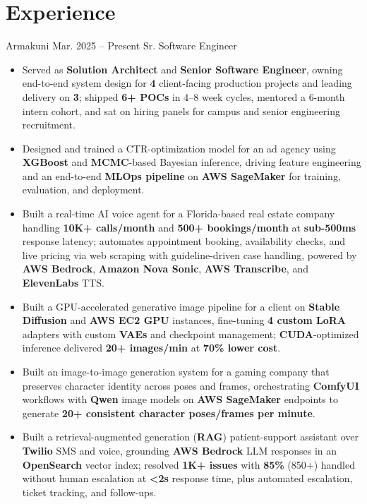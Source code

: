 \section{Experience}

\resumeSubheading
  {Armakuni}
  {Mar. 2025 – Present}
  {Sr. Software Engineer}
  {}
\begin{itemize}
  \item Served as \textbf{Solution Architect} and \textbf{Senior Software Engineer}, owning end-to-end system design for \textbf{4} client-facing production projects and leading delivery on \textbf{3}; shipped \textbf{6+ POCs} in 4–8 week cycles, mentored a 6-month intern cohort, and sat on hiring panels for campus and senior engineering recruitment.
  \item Designed and trained a CTR-optimization model for an ad agency using \textbf{XGBoost} and \textbf{MCMC}-based Bayesian inference, driving feature engineering and an end-to-end \textbf{MLOps pipeline} on \textbf{AWS SageMaker} for training, evaluation, and deployment.
  \item Built a real-time AI voice agent for a Florida-based real estate company handling \textbf{10K+ calls/month} and \textbf{500+ bookings/month} at \textbf{sub-500ms} response latency; automates appointment booking, availability checks, and live pricing via web scraping with guideline-driven case handling, powered by \textbf{AWS Bedrock}, \textbf{Amazon Nova Sonic}, \textbf{AWS Transcribe}, and \textbf{ElevenLabs} TTS.
  \item Built a GPU-accelerated generative image pipeline for a client on \textbf{Stable Diffusion} and \textbf{AWS EC2 GPU} instances, fine-tuning \textbf{4 custom LoRA} adapters with custom \textbf{VAEs} and checkpoint management; \textbf{CUDA}-optimized inference delivered \textbf{20+ images/min} at \textbf{70\% lower cost}.
  \item Built an image-to-image generation system for a gaming company that preserves character identity across poses and frames, orchestrating \textbf{ComfyUI} workflows with \textbf{Qwen} image models on \textbf{AWS SageMaker} endpoints to generate \textbf{20+ consistent character poses/frames per minute}.
  \item Built a retrieval-augmented generation (\textbf{RAG}) patient-support assistant over \textbf{Twilio} SMS and voice, grounding \textbf{AWS Bedrock} LLM responses in an \textbf{OpenSearch} vector index; resolved \textbf{1K+ issues} with \textbf{85\%} (850+) handled without human escalation at \textbf{<2s} response time, plus automated escalation, ticket tracking, and follow-ups.

\end{itemize}
